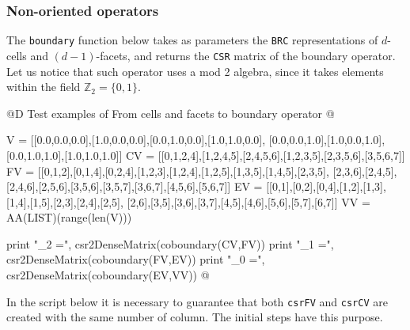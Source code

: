 \documentclass[11pt,oneside]{article}	%
\def\Z{\mathbb{Z}}
\begin{document}
\subsubsection{Non-oriented operators}

The \texttt{boundary} function below takes as parameters the \texttt{BRC} representations of $d$-cells and $(d-1)$-facets, and returns the \texttt{CSR} matrix of the boundary operator. Let us notice that such operator uses a mod 2 algebra, since it takes elements within the field $\Z_2=\{0,1\}$.

@D Test examples of From cells and facets to boundary operator
@{V = [[0.0,0.0,0.0],[1.0,0.0,0.0],[0.0,1.0,0.0],[1.0,1.0,0.0],
	   [0.0,0.0,1.0],[1.0,0.0,1.0],[0.0,1.0,1.0],[1.0,1.0,1.0]]
CV = [[0,1,2,4],[1,2,4,5],[2,4,5,6],[1,2,3,5],[2,3,5,6],[3,5,6,7]]
FV = [[0,1,2],[0,1,4],[0,2,4],[1,2,3],[1,2,4],[1,2,5],[1,3,5],[1,4,5],[2,3,5],
	  [2,3,6],[2,4,5],[2,4,6],[2,5,6],[3,5,6],[3,5,7],[3,6,7],[4,5,6],[5,6,7]]
EV = [[0,1],[0,2],[0,4],[1,2],[1,3],[1,4],[1,5],[2,3],[2,4],[2,5],
	  [2,6],[3,5],[3,6],[3,7],[4,5],[4,6],[5,6],[5,7],[6,7]]
VV = AA(LIST)(range(len(V)))

print "\ncoboundary_2 =\n", csr2DenseMatrix(coboundary(CV,FV))
print "\ncoboundary_1 =\n", csr2DenseMatrix(coboundary(FV,EV))
print "\ncoboundary_0 =\n", csr2DenseMatrix(coboundary(EV,VV))
@}

In the script below it is necessary to guarantee that both \texttt{csrFV} and \texttt{csrCV} are created with the same number of column. The initial steps have this purpose.
\end{document}
